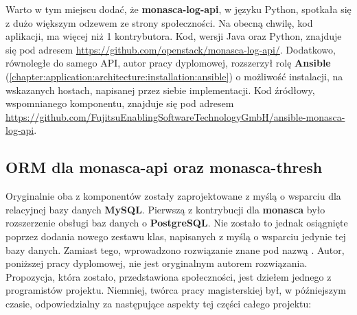 Warto w tym miejscu dodać, że \textbf{monasca-log-api}, w języku Python, spotkała się z dużo
większym odzewem ze strony społeczności. Na obecną chwilę, kod aplikacji, ma więcej niż 1 kontrybutora.
Kod, wersji Java oraz Python, znajduje się pod adresem \url{https://github.com/openstack/monasca-log-api/}.
Dodatkowo, równoległe do samego API, autor pracy dyplomowej, rozszerzył rolę \textbf{Ansible} (\ref{chapter:application:architecture:installation:ansible}) o
możliwość instalacji, na wskazanych hostach, napisanej przez siebie implementacji. Kod źródłowy, wspomnianego komponentu, znajduje się
pod adresem \url{https://github.com/FujitsuEnablingSoftwareTechnologyGmbH/ansible-monasca-log-api}.

\subsection{ORM dla monasca-api oraz monasca-thresh}
Oryginalnie oba z komponentów zostały zaprojektowane z myślą o wsparciu dla relacyjnej bazy danych \textbf{MySQL}. 
Pierwszą z kontrybucji dla \textbf{monasca} było rozszerzenie obsługi baz danych o \textbf{PostgreSQL}. Nie zostało
to jednak osiągnięte poprzez dodania nowego zestawu klas, napisanych z myślą o wsparciu jedynie tej bazy danych. Zamiast
tego, wprowadzono rozwiązanie znane pod nazwą .
Autor, poniższej pracy dyplomowej, nie jest oryginalnym autorem rozwiązania. Propozycja, która zostało,
przedstawiona społeczności, jest dziełem jednego z programistów projektu. Niemniej, twórca pracy magisterskiej był, w późniejszym czasie,
odpowiedzialny za następujące aspekty tej części całego projektu:

